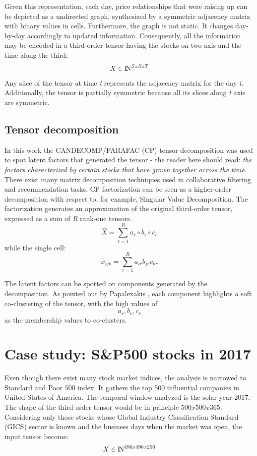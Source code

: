 \documentclass[12pt]{extarticle}
\begin{document}
Given this representation, each day, price relationships that were raising up can be depicted as a undirected graph, synthesized by a symmetric adjacency matrix with binary values in cells. 
Furthermore, the graph is not static. It changes day-by-day accordingly to updated information. Consequently, all the information may be encoded in a third-order tensor having the stocks on two axis and the time along the third:
$$
    X \in {\rm I\!N}^{S x S x T}
$$
Any slice of the tensor at time \textit{t} represents the adjacency matrix for the day \textit{t}. Additionally, the tensor is partially symmetric because all its slices along \textit{t} axis are symmetric.

\subsection{Tensor decomposition}

In this work the CANDECOMP/PARAFAC (CP) \cite{carroll1970analysis}\cite{harshman1970foundations} tensor decomposition was used to spot latent factors that generated the tensor - the reader here should read: \textit{the factors characterized by certain stocks that have grown together across the time}. 
There exist many matrix decomposition techniques used in collaborative filtering and recommendation tasks. CP factorization can be seen as a higher-order decomposition with respect to, for example, Singular Value Decomposition. 
The factorization generates an approximation of the original third-order tensor, expressed as a sum of \textit{R} rank-one tensors.
$$
    \hat{X} = \sum_{r=1}^R a_r \circ b_r \circ c_r
$$
while the single cell:
$$
    \hat{x}_{ijk} = \sum_{r=1}^R a_{ir} b_{jr} c_{kr}
$$

The latent factors can be spotted on components generated by the decomposition. As pointed out by Papalexakis \cite{papalexakis2016automatic}, each component highlights a soft co-clustering of the tensor, with the high values of $$ a_r, b_r, c_r $$ as the membership values to co-clusters.    

\section{Case study: S\&P500 stocks in 2017}

Even though there exist many stock market indices, the analysis is narrowed to Standard and Poor 500 index. It gathers the top 500 influential companies in United States of America. The temporal window analyzed is the solar year 2017.
The shape of the third-order tensor would be in principle
$
	500 x 500 x 365
$.
Considering only those stocks whose Global Industry Classification Standard (GICS) sector is known and the business days when the market was open, the input tensor become:
$$
	X \in {\rm I\!N}^{496 x 496 x 250}
$$
\end{document}
